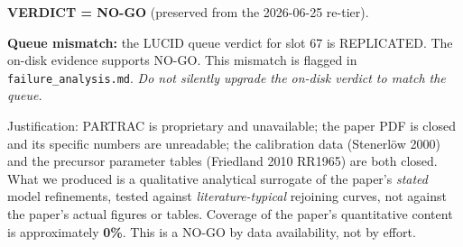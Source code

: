 \documentclass[11pt]{article}
\begin{document}
\textbf{VERDICT = NO-GO} (preserved from the 2026-06-25 re-tier).

\textbf{Queue mismatch:} the LUCID queue verdict for slot 67 is REPLICATED.
The on-disk evidence supports NO-GO. This mismatch is flagged in
\texttt{failure\_analysis.md}. \emph{Do not silently upgrade the on-disk
verdict to match the queue.}

Justification: PARTRAC is proprietary and unavailable; the paper PDF is
closed and its specific numbers are unreadable; the calibration data
(Stenerl\"ow 2000) and the precursor parameter tables (Friedland 2010
RR1965) are both closed. What we produced is a qualitative analytical
surrogate of the paper's \emph{stated} model refinements, tested against
\emph{literature-typical} rejoining curves, not against the paper's actual
figures or tables. Coverage of the paper's quantitative content is
approximately \textbf{0\%}. This is a NO-GO by data availability, not by
effort.
\end{document}
